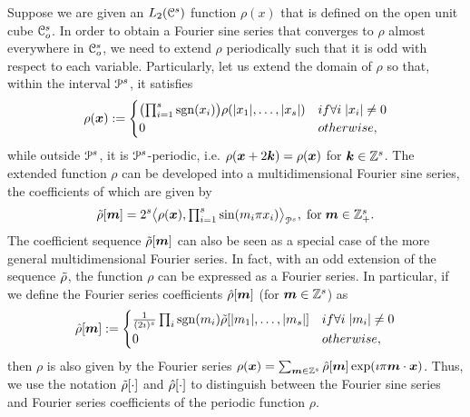 Suppose we are given an $L_2(\mathcal{C}^s)$ function $\rho(x)$ that is
defined on the open unit cube $\mathcal{C}_o^s$. In order to obtain a
Fourier sine series that converges to $\rho$ almost everywhere in
$\mathcal{C}_o^s$, we need to extend $\rho$ periodically such that it is odd
with respect to each variable. Particularly, let us extend the domain
of $\rho$ so that, within the interval $\mathcal{P}^s$, it satisfies
\begin{equation}
  \small{
 \rho(\vect{x}) :=  
\begin{cases}
\bigl( \prod_{i=1}^s \sgn(x_i) \bigr)
\rho(|x_1|, \ldots, |x_s| ) &\mbox{if } \forall i \; |x_i| \ne 0 \\ 
0 &\mbox{otherwise},
\end{cases}
}
\label{eq:oddextension}
\end{equation}
while outside $\mathcal{P}^s$, it is $\mathcal{P}^s$-periodic, i.e. $\rho(\boldsymbol{x}
+ 2\boldsymbol{k}) = \rho(\boldsymbol{x})$ for $\boldsymbol{k} \in \mathbb{Z}^s$. The
extended function $\rho$ can be developed into a multidimensional
Fourier sine series, the coefficients of which are given by 
\begin{equation}
  \tilde{\rho}[\boldsymbol{m}] = 2^s \bigl \langle \rho(\boldsymbol{x}) , \textstyle{\prod_{i=1}^s}\sin(m_i\pi x_i) \bigr \rangle_{\mathcal{P}^s}, \; \text{for}\; \boldsymbol{m} \in \mathbb{Z}^s_+.
\end{equation}
The coefficient sequence $\tilde{\rho}[\boldsymbol{m}]$ can also be seen as a
special case of the more general multidimensional Fourier
series. In fact, with an odd extension of the sequence $\tilde{\rho}$, the
function $\rho$ can be expressed as a Fourier series. In particular,
if we define the Fourier series coefficients $\hat{\rho}[\boldsymbol{m}]$
(for $\boldsymbol{m} \in \mathbb{Z}^s$) as
\begin{equation}
  \small{
  \ft{\rho}[\vect{m}] := 
\begin{cases}
\frac{1}{(2\imath)^{s}} \prod_i \sgn(m_i)
\st{\rho}[|m_1|,\ldots,|m_s|] &\mbox{if } \forall i \; |m_i| \ne 0 \\
0 &\mbox{otherwise},
\end{cases}
}
\label{eq:oddFourierExtension}
\end{equation}
then  $\rho$ is also given by the Fourier series
$
  \rho(\boldsymbol{x}) = \sum_{\boldsymbol{m} \in
    \mathbb{Z}^s} \hat{\rho}[\boldsymbol{m}] 
\exp(\imath \pi \boldsymbol{m} \cdot \boldsymbol{x})
$.
Thus, we use the notation $\tilde{\rho}[\cdot]$ and $\hat{\rho}[\cdot]$ to
distinguish between the Fourier sine series and Fourier series
coefficients of the periodic function $\rho$.

